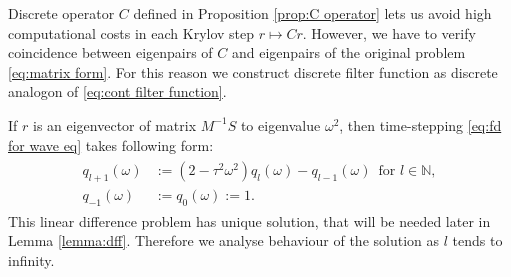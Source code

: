 \documentclass[a4paper,11pt,bibliography=totoc,listof=totoc,headinclude=true,cleardoublepage=empty,oneside]{scrbook}
\newcommand{\N}{\mathbb{N}}
\begin{document}
Discrete operator $C$ defined in Proposition \ref{prop:C operator} lets us avoid high computational costs in each Krylov step $r \mapsto Cr$. However, we have to verify coincidence between eigenpairs of $C$ and eigenpairs of the original problem \eqref{eq:matrix form}. For this reason we construct discrete filter function as discrete analogon of \eqref{eq:cont filter function}. 

If $r$ is an eigenvector of matrix $M^{-1}S$ to eigenvalue $\omega^2$, then time-stepping \eqref{eq:fd for wave eq} takes following form:
\begin{align}\label{eq:q def}
    \begin{split}
        q_{l+1}(\omega) &:= (2-\tau^2\omega^2) q_l(\omega) - q_{l-1}(\omega) \, \text{ for } l \in \N,\\
        q_{-1}(\omega) &:= q_0(\omega) := 1.
    \end{split}
\end{align}
This linear difference problem has unique solution, that will be needed later in Lemma \ref{lemma:dff}. Therefore we analyse behaviour of the solution as $l$ tends to infinity.
\end{document}
